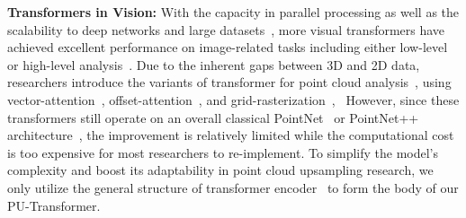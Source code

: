 \noindent \textbf{Transformers in Vision:}
With the capacity in parallel processing as well as the scalability to deep networks and large datasets~\cite{khan2021transformers}, more visual transformers have achieved excellent performance on image-related tasks including either low-level~\cite{yang2020learning,chen2021pre} or high-level analysis~\cite{dosovitskiy2020image,liu2021swin,carion2020end,zhu2020deformable}. Due to the inherent gaps between 3D and 2D data, researchers introduce the variants of transformer for point cloud analysis~\cite{yew2022regtr,fan2021point,yu2022point,fan2022point,yu2021pointr}, using vector-attention~\cite{zhao2021point}, offset-attention~\cite{guo2021pct}, and grid-rasterization~\cite{mazur2021cloud}, \etc ~However, since these transformers still operate on an overall classical PointNet~\cite{qi2017pointnet} or PointNet++ architecture~\cite{qi2017pointnet++}, the improvement is relatively limited while the computational cost is too expensive for most researchers to re-implement. To simplify the model's complexity and boost its adaptability in point cloud upsampling research, we only utilize the general structure of transformer encoder~\cite{dosovitskiy2020image} to form the body of our PU-Transformer.

